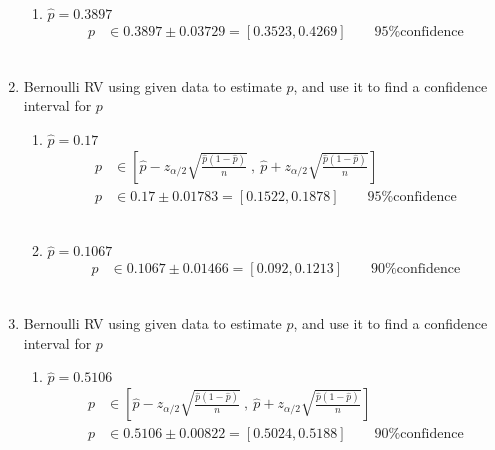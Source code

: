 \begin{enumerate}
\begin{enumerate}
			\item $ \widehat{p}  = 0.3897$ \\
			\begin{align}
				p &\in 0.3897 \pm 0.03729 = [0.3523, 0.4269] \qquad \text{95\% confidence}
			\end{align} \\
		\end{enumerate}
	
	
	\item Bernoulli RV using given data to estimate $ \widehat{p} $, and use it to find a confidence interval for $ p $ \\
	
		\begin{enumerate}
			\item $ \widehat{p}  = 0.17$ \\
			\begin{align}
				p &\in \left[ \widehat{p} - z_{\alpha/2}\sqrt{\frac{\widehat{p}(1-\widehat{p})}{n}}\ ,\ \widehat{p} + z_{\alpha/2}\sqrt{\frac{\widehat{p}(1-\widehat{p})}{n}}  \right] \nonumber \\
				p &\in 0.17 \pm 0.01783 = [0.1522, 0.1878] \qquad \text{95\% confidence}
			\end{align} \\
			
			\item $ \widehat{p}  = 0.1067$ \\
			\begin{align}
				p &\in 0.1067 \pm 0.01466 = [0.092, 0.1213] \qquad \text{90\% confidence}
			\end{align} \\
		\end{enumerate}
	
	
	\item Bernoulli RV using given data to estimate $ \widehat{p} $, and use it to find a confidence interval for $ p $ \\
	
		\begin{enumerate}
			\item $ \widehat{p}  = 0.5106$ \\
			\begin{align}
				p &\in \left[ \widehat{p} - z_{\alpha/2}\sqrt{\frac{\widehat{p}(1-\widehat{p})}{n}}\ ,\ \widehat{p} + z_{\alpha/2}\sqrt{\frac{\widehat{p}(1-\widehat{p})}{n}}  \right] \nonumber \\
				p &\in 0.5106 \pm 0.00822 = [0.5024, 0.5188] \qquad \text{90\% confidence}
			\end{align} \\
			

\end{enumerate}
\end{enumerate}
